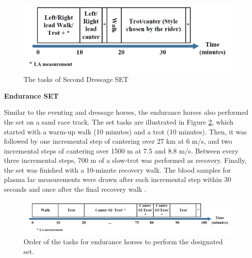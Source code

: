 \begin{figure}[!htbp]
\centering
\includegraphics[scale=0.30]{chapters/data/figures/DressageSET.png}
\caption{The tasks of Second Dressage SET}
\label{fig:dressageset}
\end{figure}

\vspace{5pt}
{\noindent\textbf{Endurance SET} \par}
Similar to the eventing and dressage horses, the endurance horses also performed the \gls{set} on a sand race track. The \gls{set} tasks are illustrated in Figure \ref{fig:enduranceset}, which started with a warm-up walk (10 minutes) and a trot (10 minutes). Then, it was followed by one incremental step of cantering over 27 km at 6 m/s, and two incremental steps of cantering over 1500 m at 7.5 and 8.8 m/s. Between every three incremental steps, 700 m of a slow-trot was performed as recovery. Finally, the \gls{set} was finished with a 10-minute recovery walk. The blood samples for plasma \gls{lac} measurements were drawn after each incremental step within 30 seconds and once after the final recovery walk \cite{fraipont}.

\begin{figure}[!htbp]
\centering
\includegraphics[scale=0.27]{chapters/data/figures/EnduranceSET.png}
\caption{Order of the tasks for endurance horses to perform the designated \gls{set}.}
\label{fig:enduranceset}
\end{figure}